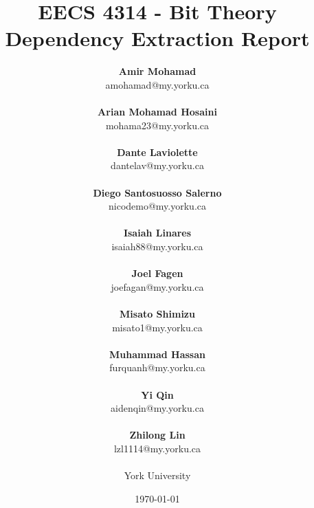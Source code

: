 \documentclass[12pt, dvipsnames, a4paper]{article}
\begin{document}
\title{\textbf{EECS 4314 - Bit Theory\\Dependency Extraction Report}}
\date{\Large \today}
\author{
	\large \textbf{Amir Mohamad}\\ \small amohamad@my.yorku.ca\\\\
	\large \textbf{Arian Mohamad Hosaini}\\ \small mohama23@my.yorku.ca\\\\
	\large \textbf{Dante Laviolette}\\ \small dantelav@my.yorku.ca\\\\
	\large \textbf{Diego Santosuosso Salerno}\\ \small nicodemo@my.yorku.ca\\\\
	\large \textbf{Isaiah Linares}\\ \small isaiah88@my.yorku.ca\\\\
	\large \textbf{Joel Fagen}\\ \small joefagan@my.yorku.ca\\\\
	\large \textbf{Misato Shimizu}\\ \small misato1@my.yorku.ca\\\\
	\large \textbf{Muhammad Hassan}\\ \small furquanh@my.yorku.ca\\\\
	\large \textbf{Yi Qin}\\ \small aidenqin@my.yorku.ca\\\\
	\large \textbf{Zhilong Lin}\\ \small lzl1114@my.yorku.ca\\\\
	\large York University\\
}
\maketitle
\newpage
\hspace{0pt}
\vfill
\end{document}
